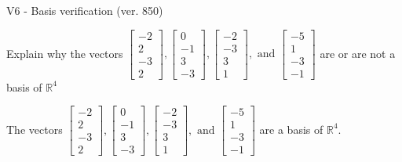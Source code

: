 \begin{exercise}
  \begin{exerciseTitle}V6 - Basis verification (ver. 850)\end{exerciseTitle}
  \begin{exerciseStatement}
    Explain why the vectors \(\left[\begin{array}{r}
-2 \\
2 \\
-3 \\
2
\end{array}\right] , \left[\begin{array}{r}
0 \\
-1 \\
3 \\
-3
\end{array}\right] , \left[\begin{array}{r}
-2 \\
-3 \\
3 \\
1
\end{array}\right] , \text{ and } \left[\begin{array}{r}
-5 \\
1 \\
-3 \\
-1
\end{array}\right]\) are or are not a basis of \(\mathbb{R}^4\)	


  \end{exerciseStatement}
  \begin{exerciseAnswer}
   The vectors \(\left[\begin{array}{r}
-2 \\
2 \\
-3 \\
2
\end{array}\right] , \left[\begin{array}{r}
0 \\
-1 \\
3 \\
-3
\end{array}\right] , \left[\begin{array}{r}
-2 \\
-3 \\
3 \\
1
\end{array}\right] , \text{ and } \left[\begin{array}{r}
-5 \\
1 \\
-3 \\
-1
\end{array}\right]\) 
  	 are  a basis of \(\mathbb{R}^4\).
  


  \end{exerciseAnswer}
\end{exercise}
